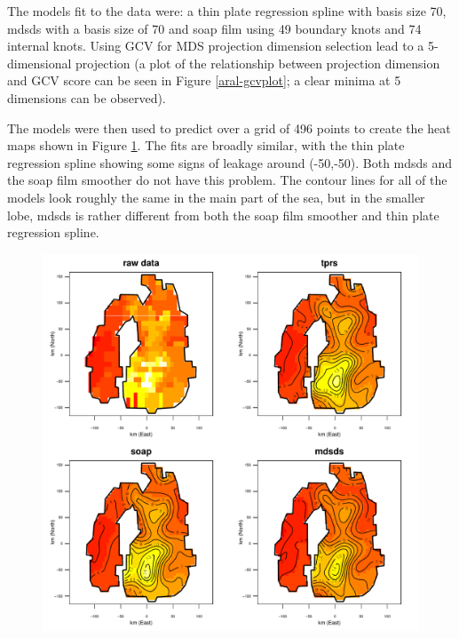 \documentclass[useAMS,referee]{biom}
\begin{document}
The models fit to the data were: a thin plate regression spline with basis size 70, mdsds with a basis size of 70 and soap film using 49 boundary knots and 74 internal knots. Using GCV for MDS projection dimension selection lead to a 5-dimensional projection (a plot of the relationship between projection dimension and GCV score can be seen in Figure \ref{aral-gcvplot}; a clear minima at 5 dimensions can be observed).

The models were then used to predict over a grid of 496 points to create the heat maps shown in Figure \ref{aral-plot}. The fits are broadly similar, with the thin plate regression spline showing some signs of leakage around (-50,-50). Both mdsds and the soap film smoother do not have this problem. The contour lines for all of the models look roughly the same in the main part of the sea, but in the smaller lobe, mdsds is rather different from both the soap film smoother and thin plate regression spline. 






\begin{figure}
\centering
\includegraphics[width=\textwidth]{examples/aral/aral-plot.pdf} \\
\caption{}
\label{aral-plot}
\end{figure}
\end{document}
